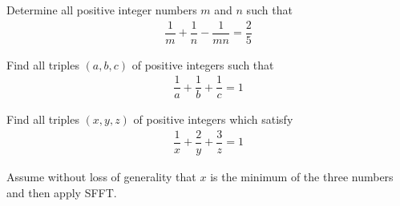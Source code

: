 
\begin{problem} %
	Determine all positive integer numbers $m$ and $n$ such that
		\begin{align*}
			\dfrac{1}{m}+\dfrac{1}{n}-\dfrac{1}{mn}=\dfrac{2}{5}
		\end{align*}
\end{problem}

\begin{problem} %
	Find all triples $(a,b,c)$ of positive integers such that
		\begin{align*}
			\dfrac{1}{a}+\dfrac{1}{b}+\dfrac{1}{c}=1
		\end{align*}
\end{problem}

\begin{problem} %
	Find all triples $(x,y,z)$ of positive integers which satisfy
		\begin{align*}
			\dfrac{1}{x}+\dfrac{2}{y}+\dfrac{3}{z}=1
		\end{align*}
\end{problem}

\begin{hint}
	Assume without loss of generality that $x$ is the minimum of the three numbers and then apply SFFT.
\end{hint}

